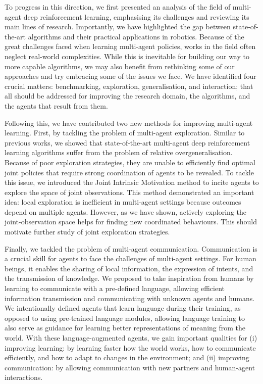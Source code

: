 To progress in this direction, we first presented an analysis of the field of multi-agent deep reinforcement learning, emphasising its challenges and reviewing its main lines of research. Importantly, we have highlighted the gap between state-of-the-art algorithms and their practical applications in robotics. Because of the great challenges faced when learning multi-agent policies, works in the field often neglect real-world complexities. While this is inevitable for building our way to more capable algorithms, we may also benefit from rethinking some of our approaches and try embracing some of the issues we face. We have identified four crucial matters: benchmarking, exploration, generalisation, and interaction; that all should be addressed for improving the research domain, the algorithms, and the agents that result from them. 

Following this, we have contributed two new methods for improving multi-agent learning. First, by tackling the problem of multi-agent exploration. Similar to previous works, we showed that state-of-the-art multi-agent deep reinforcement learning algorithms suffer from the problem of relative overgeneralisation. Because of poor exploration strategies, they are unable to efficiently find optimal joint policies that require strong coordination of agents to be revealed. To tackle this issue, we introduced the Joint Intrinsic Motivation method to incite agents to explore the space of joint observations. This method demonstrated an important idea: local exploration is inefficient in multi-agent settings because outcomes depend on multiple agents. However, as we have shown, actively exploring the joint-observation space helps for finding new coordinated behaviours. This should motivate further study of joint exploration strategies. 

Finally, we tackled the problem of multi-agent communication. Communication is a crucial skill for agents to face the challenges of multi-agent settings. For human beings, it enables the sharing of local information, the expression of intents, and the transmission of knowledge. We proposed to take inspiration from humans by learning to communicate with a pre-defined language, allowing efficient information transmission and communicating with unknown agents and humans. We intentionally defined agents that learn language during their training, as opposed to using pre-trained language modules, allowing language training to also serve as guidance for learning better representations of meaning from the world. With these language-augmented agents, we gain important qualities for (i) improving learning: by learning faster how the world works, how to communicate efficiently, and how to adapt to changes in the environment; and (ii) improving communication: by allowing communication with new partners and human-agent interactions. 




